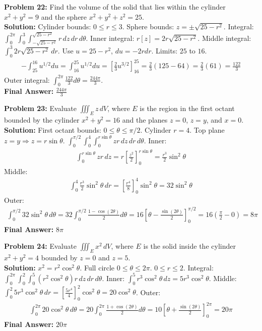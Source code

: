 \documentclass[12pt]{article}
\begin{document}
\textbf{Problem 22:} Find the volume of the solid that lies within the cylinder $x^2+y^2=9$ and the sphere $x^2+y^2+z^2=25$.
\\
\textbf{Solution:} Cylinder bounds: $0 \le r \le 3$. Sphere bounds: $z = \pm\sqrt{25-r^2}$.
Integral: $\int_0^{2\pi} \int_0^3 \int_{-\sqrt{25-r^2}}^{\sqrt{25-r^2}} r \, dz \, dr \, d\theta$.
Inner integral: $r [z] = 2r\sqrt{25-r^2}$.
Middle integral: $\int_0^3 2r\sqrt{25-r^2} \, dr$. Use $u = 25-r^2$, $du = -2rdr$. Limits: $25$ to $16$.
\begin{align*}
-\int_{25}^{16} u^{1/2} du = \int_{16}^{25} u^{1/2} du = \left[ \frac{2}{3}u^{3/2} \right]_{16}^{25} = \frac{2}{3}(125 - 64) = \frac{2}{3}(61) = \frac{122}{3}
\end{align*}
Outer integral: $\int_0^{2\pi} \frac{122}{3} d\theta = \frac{244\pi}{3}$.
\\
\textbf{Final Answer:} $\frac{244\pi}{3}$
\vspace{0.5cm}

\textbf{Problem 23:} Evaluate $\iiint_E z \, dV$, where $E$ is the region in the first octant bounded by the cylinder $x^2+y^2=16$ and the planes $z=0$, $z=y$, and $x=0$.
\\
\textbf{Solution:} First octant bounds: $0 \le \theta \le \pi/2$. Cylinder $r=4$. Top plane $z=y \Rightarrow z=r\sin\theta$.
$\int_0^{\pi/2} \int_0^4 \int_0^{r\sin\theta} z r \, dz \, dr \, d\theta$.
Inner:
\begin{align*}
\int_0^{r\sin\theta} zr \, dz = r\left[\frac{z^2}{2}\right]_0^{r\sin\theta} = \frac{r^3}{2}\sin^2\theta
\end{align*}
Middle:
\begin{align*}
\int_0^4 \frac{r^3}{2}\sin^2\theta \, dr = \left[ \frac{r^4}{8} \right]_0^4 \sin^2\theta = 32\sin^2\theta
\end{align*}
Outer:
\begin{align*}
\int_0^{\pi/2} 32\sin^2\theta \, d\theta = 32 \int_0^{\pi/2} \frac{1-\cos(2\theta)}{2} d\theta = 16 \left[ \theta - \frac{\sin(2\theta)}{2} \right]_0^{\pi/2} = 16\left(\frac{\pi}{2} - 0\right) = 8\pi
\end{align*}
\textbf{Final Answer:} $8\pi$
\vspace{0.5cm}

\textbf{Problem 24:} Evaluate $\iiint_E x^2 \, dV$, where $E$ is the solid inside the cylinder $x^2+y^2=4$ bounded by $z=0$ and $z=5$.
\\
\textbf{Solution:} $x^2 = r^2\cos^2\theta$. Full circle $0 \le \theta \le 2\pi$. $0 \le r \le 2$. Integral: $\int_0^{2\pi} \int_0^2 \int_0^5 (r^2\cos^2\theta) r \, dz \, dr \, d\theta$.
Inner: $\int_0^5 r^3\cos^2\theta \, dz = 5r^3\cos^2\theta$.
Middle: $\int_0^2 5r^3\cos^2\theta \, dr = \left[ \frac{5r^4}{4} \right]_0^2 \cos^2\theta = 20\cos^2\theta$.
Outer: 
\begin{align*}
\int_0^{2\pi} 20\cos^2\theta \, d\theta = 20 \int_0^{2\pi} \frac{1+\cos(2\theta)}{2} d\theta = 10\left[\theta + \frac{\sin(2\theta)}{2}\right]_0^{2\pi} = 20\pi
\end{align*}
\textbf{Final Answer:} $20\pi$
\vspace{0.5cm}
\end{document}
